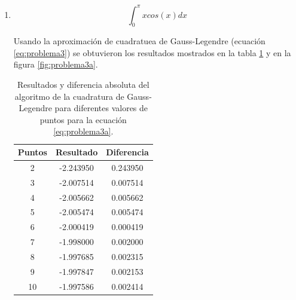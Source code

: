 \begin{enumerate}
    \item \begin{equation}
              \int_0^\pi xcos(x) dx \label{eq:problema3a}
          \end{equation}

          Usando la aproximación de cuadratuea de Gauss-Legendre (ecuación \ref{eq:problema3}) se obtuvieron los resultados mostrados en la tabla \ref{table:problema3a} y en la figura \ref{fig:problema3a}.

          \begin{table}[H]
              \centering
              \begin{tabular}{ccc} \hline
                  \textbf{Puntos} & \textbf{Resultado} & \textbf{Diferencia} \\ \hline
                  2               & -2.243950          & 0.243950            \\
                  3               & -2.007514          & 0.007514            \\
                  4               & -2.005662          & 0.005662            \\
                  5               & -2.005474          & 0.005474            \\
                  6               & -2.000419          & 0.000419            \\
                  7               & -1.998000          & 0.002000            \\
                  8               & -1.997685          & 0.002315            \\
                  9               & -1.997847          & 0.002153            \\
                  10              & -1.997586          & 0.002414            \\ \hline
              \end{tabular}
              \caption{Resultados y diferencia absoluta del algoritmo de la cuadratura de  Gauss-Legendre para diferentes valores de puntos para la ecuación \ref{eq:problema3a}.}
              \label{table:problema3a}
          \end{table}


\end{enumerate}
